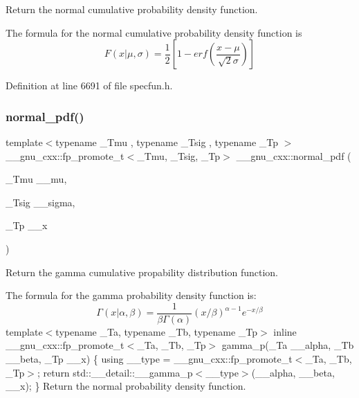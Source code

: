 Return the normal cumulative probability density function. 

The formula for the normal cumulative probability density function is \[ F(x|\mu,\sigma) = \frac{1}{2}\left[ 1-erf(\frac{x-\mu}{\sqrt{2}\sigma}) \right] \] 

Definition at line 6691 of file specfun.\+h.

\mbox{\label{group__gnu__math__spec__func_gab795379781dea732cbc7556351760401}} 
\subsubsection{\texorpdfstring{normal\+\_\+pdf()}{normal\_pdf()}}
{\footnotesize\ttfamily template$<$typename \+\_\+\+Tmu , typename \+\_\+\+Tsig , typename \+\_\+\+Tp $>$ \\
\+\_\+\+\_\+gnu\+\_\+cxx\+::fp\+\_\+promote\+\_\+t$<$\+\_\+\+Tmu, \+\_\+\+Tsig, \+\_\+\+Tp$>$ \+\_\+\+\_\+gnu\+\_\+cxx\+::normal\+\_\+pdf (\begin{DoxyParamCaption}\item[{\+\_\+\+Tmu}]{\+\_\+\+\_\+mu,  }\item[{\+\_\+\+Tsig}]{\+\_\+\+\_\+sigma,  }\item[{\+\_\+\+Tp}]{\+\_\+\+\_\+x }\end{DoxyParamCaption})\hspace{0.3cm}{\ttfamily [inline]}}



Return the gamma cumulative propability distribution function. 

The formula for the gamma probability density function is\+: \[ \Gamma(x|\alpha,\beta) = \frac{1}{\beta\Gamma(\alpha)} (x/\beta)^{\alpha - 1} e^{-x/\beta} \] template$<$typename \+\_\+\+Ta, typename \+\_\+\+Tb, typename \+\_\+\+Tp$>$ inline \+\_\+\+\_\+gnu\+\_\+cxx\+::fp\+\_\+promote\+\_\+t$<$\+\_\+\+Ta, \+\_\+\+Tb, \+\_\+\+Tp$>$ gamma\+\_\+p(\+\_\+\+Ta \+\_\+\+\_\+alpha, \+\_\+\+Tb \+\_\+\+\_\+beta, \+\_\+\+Tp \+\_\+\+\_\+x) \{ using \+\_\+\+\_\+type = \+\_\+\+\_\+gnu\+\_\+cxx\+::fp\+\_\+promote\+\_\+t$<$\+\_\+\+Ta, \+\_\+\+Tb, \+\_\+\+Tp$>$; return std\+::\+\_\+\+\_\+detail\+::\+\_\+\+\_\+gamma\+\_\+p$<$\+\_\+\+\_\+type$>$(\+\_\+\+\_\+alpha, \+\_\+\+\_\+beta, \+\_\+\+\_\+x); \} Return the normal probability density function.

